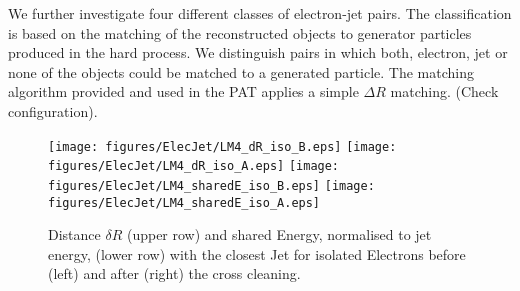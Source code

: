 \documentclass{cmspaper}
\begin{document}
We further investigate four different classes of electron-jet pairs. The
classification is based on the matching of the reconstructed objects
to generator particles produced in the hard process. We distinguish pairs in
which both, electron, jet or none of the objects could be matched to a generated
particle. The matching algorithm provided and used in the PAT applies a simple
$\Delta R$ matching. {\color{red}(Check configuration)}.




\begin{figure}[hb]
\begin{center}
    \texttt{[image: figures/ElecJet/LM4\_dR\_iso\_B.eps]}
    \texttt{[image: figures/ElecJet/LM4\_dR\_iso\_A.eps]}
    \texttt{[image: figures/ElecJet/LM4\_sharedE\_iso\_B.eps]}
    \texttt{[image: figures/ElecJet/LM4\_sharedE\_iso\_A.eps]}
    \caption{Distance \(\delta R\) (upper row) and shared Energy, normalised to jet energy, (lower row) with the closest Jet for isolated Electrons before (left) and after (right) the cross cleaning.}
\label{fig:dR_sE_ElecJet_iso}
\end{center}
\end{figure}

\end{document}
